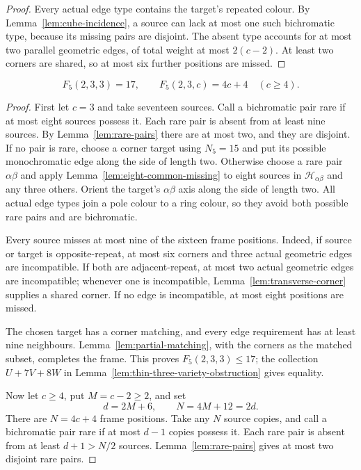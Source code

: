 \begin{proof}
Every actual edge type contains the target's repeated colour. By
Lemma~\ref{lem:cube-incidence}, a source
can lack at most one such bichromatic type, because its missing pairs
are disjoint. The absent type accounts for at most two parallel geometric
edges, of total weight at most $2(c-2)$. At least two corners are shared,
so at most six further positions are missed.
\end{proof}

\begin{theorem}
\label{thm:23c-sharp}
\[
 F_5(2,3,3)=17,\qquad
 F_5(2,3,c)=4c+4\quad(c\ge4).
\]
\end{theorem}

\begin{proof}
First let $c=3$ and take seventeen sources. Call a bichromatic pair
rare if at most eight sources possess it. Each rare pair is absent from
at least nine sources. By Lemma~\ref{lem:rare-pairs} there are
at most two, and they are disjoint. If no pair is rare, choose a corner target using $N_5=15$
and put its possible monochromatic edge along the side of length two.
Otherwise choose a rare pair $\alpha\beta$ and apply
Lemma~\ref{lem:eight-common-missing} to eight sources in $\mathcal H_{\alpha\beta}$
and any three others. Orient the target's $\alpha\beta$ axis along the side of
length two. All actual edge types join a pole colour to a ring colour,
so they avoid both possible rare pairs and are bichromatic.

Every source misses at most nine of the sixteen frame positions. Indeed,
if source or target is opposite-repeat, at most six corners and three
actual geometric edges are incompatible. If both are adjacent-repeat,
at most two actual geometric edges are incompatible; whenever one is
incompatible, Lemma~\ref{lem:transverse-corner} supplies a shared corner. If no edge
is incompatible, at most eight positions are missed.

The chosen target has a corner matching, and every edge requirement has
at least nine neighbours. Lemma~\ref{lem:partial-matching}, with the corners
as the matched subset, completes the frame. This proves $F_5(2,3,3)\le17$; the
collection $U+7V+8W$ in Lemma~\ref{lem:thin-three-variety-obstruction}
gives equality.

Now let $c\ge4$, put $M=c-2\ge2$, and set
\[
 d=2M+6,\qquad N=4M+12=2d.
\]
There are $N=4c+4$ frame positions. Take any $N$ source copies, and call
a bichromatic pair rare if at most $d-1$ copies possess it. Each rare
pair is absent from at least $d+1>N/2$ sources. Lemma~\ref{lem:rare-pairs}
gives at most two disjoint rare pairs.


\end{proof}
